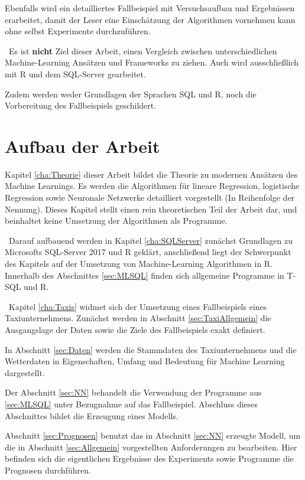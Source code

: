 Ebenfalls wird ein detailliertes Fallbeispiel mit Versuchsaufbau und Ergebnissen erarbeitet, damit der Leser eine Einschätzung der Algorithmen vornehmen kann ohne selbst Experimente durchzuführen.

~\newline Es ist \textbf{nicht} Ziel dieser Arbeit, einen Vergleich zwischen unterschiedlichen Machine-Learning Ansätzen und Frameworks zu ziehen. Auch wird ausschließlich mit R und dem SQL-Server gearbeitet. 

Zudem werden weder Grundlagen der Sprachen SQL und R, noch die Vorbereitung des Fallbeispiels geschildert.

\section{Aufbau der Arbeit}
Kapitel \ref{cha:Theorie} dieser Arbeit bildet die Theorie zu modernen Ansätzen des Machine Learnings. Es werden die Algorithmen für lineare Regression, logistische Regression sowie Neuronale Netzwerke detailliert vorgestellt (In Reihenfolge der Nennung). Dieses Kapitel stellt einen rein theoretischen Teil der Arbeit dar, und beinhaltet keine Umsetzung der Algorithmen als Programme.

~\newline Darauf aufbauend  werden in Kapitel \ref{cha:SQLServer} zunächst Grundlagen zu Microsofts SQL-Server 2017 und R geklärt, anschließend liegt der Schwerpunkt des Kapitels auf der Umsetzung von Machine-Learning Algorithmen in R. Innerhalb des Abschnittes \ref{sec:MLSQL} finden sich allgemeine Programme in T-SQL und R.

~\newline Kapitel \ref{cha:Taxis} widmet sich der Umsetzung eines Fallbeispiels eines Taxiunternehmens. Zunächst werden in Abschnitt \ref{sec:TaxiAllgemein} die Ausgangslage der Daten sowie die Ziele des Fallbeispiels exakt definiert. 

In Abschnitt \ref{sec:Daten} werden die Stammdaten des Taxiunternehmens und die Wetterdaten in Eigenschaften, Umfang und Bedeutung für Machine Learning dargestellt. 

Der Abschnitt \ref{sec:NN} behandelt die Verwendung der Programme aus \ref{sec:MLSQL} unter Bezugnahme auf das Fallbeispiel. Abschluss dieses Abschnittes bildet die Erzeugung eines Modells. 

Abschnitt \ref{sec:Prognosen} benutzt das in Abschnitt \ref{sec:NN} erzeugte Modell, um die in Abschnitt \ref{sec:Allgemein} vorgestellten Anforderungen zu bearbeiten. Hier befinden sich die eigentlichen Ergebnisse des Experiments sowie Programme die Prognosen durchführen.

